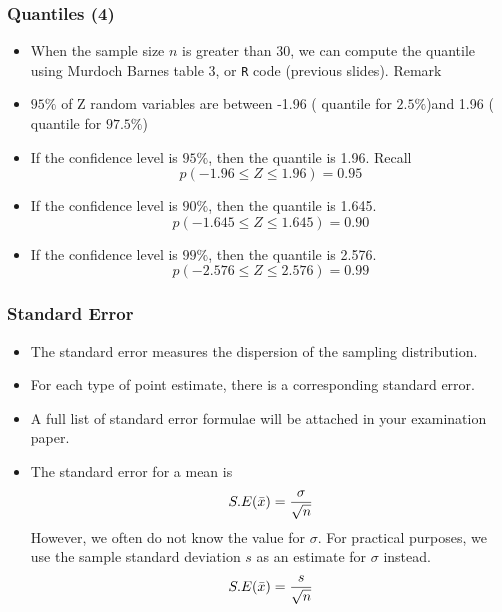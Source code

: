 \documentclass[a4]{beamer}
\begin{document}
\begin{frame}
\frametitle{Quantiles (4)}

\begin{itemize} \item When the sample size $n$ is greater than 30, we can compute the quantile using Murdoch Barnes table 3, or \texttt{R} code (previous slides).
Remark

\item $95\%$ of Z random variables are between -1.96 ( quantile for $2.5\%$)and 1.96 ( quantile for $97.5\%$)
\end{itemize}

\begin{itemize}
\item If the confidence level is $95\%$, then the quantile is 1.96. Recall
\[ p( -1.96 \leq Z \leq 1.96) = 0.95 \]

\item If the confidence level is $90\%$, then the quantile is 1.645.
\[ p( -1.645 \leq Z \leq 1.645) = 0.90 \]

\item If the confidence level is $99\%$, then the quantile is 2.576.
\[ p( -2.576 \leq Z \leq 2.576) = 0.99 \]

\end{itemize}



\end{frame}



\begin{frame}
\frametitle{Standard Error}

\begin{itemize}
\item The standard error measures the dispersion of the sampling distribution.
\item For each type of point estimate, there is a corresponding standard error.
\item A full list of standard error formulae will be attached in your examination paper.
\item The standard error for a  mean is
\[ S.E( \bar{x} )  = {\sigma \over \sqrt{n}} \]
However, we often do not know the value for $\sigma$. For practical purposes, we use the sample standard deviation $s$ as an estimate for $\sigma$ instead.
\[ S.E( \bar{x} )  = {s \over \sqrt{n}} \]
\end{itemize}

\end{frame}
\end{document}
